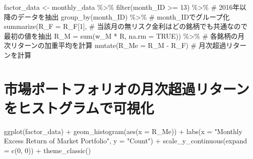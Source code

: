 \documentclass[
  letterpaper,
  DIV=11,
  numbers=noendperiod]{scrreprt}
\newenvironment{Shaded}{\begin{snugshade}}{\end{snugshade}}
\newcommand{\AttributeTok}[1]{\textcolor[rgb]{0.40,0.45,0.13}{#1}}
\newcommand{\CommentTok}[1]{\textcolor[rgb]{0.37,0.37,0.37}{#1}}
\newcommand{\ConstantTok}[1]{\textcolor[rgb]{0.56,0.35,0.01}{#1}}
\newcommand{\DecValTok}[1]{\textcolor[rgb]{0.68,0.00,0.00}{#1}}
\newcommand{\FunctionTok}[1]{\textcolor[rgb]{0.28,0.35,0.67}{#1}}
\newcommand{\NormalTok}[1]{\textcolor[rgb]{0.00,0.23,0.31}{#1}}
\newcommand{\OtherTok}[1]{\textcolor[rgb]{0.00,0.23,0.31}{#1}}
\newcommand{\SpecialCharTok}[1]{\textcolor[rgb]{0.37,0.37,0.37}{#1}}
\newcommand{\StringTok}[1]{\textcolor[rgb]{0.13,0.47,0.30}{#1}}
\begin{document}
\begin{Shaded}
\begin{Highlighting}[]
\NormalTok{factor\_data }\OtherTok{\textless{}{-}}\NormalTok{ monthly\_data }\SpecialCharTok{\%\textgreater{}\%} 
  \FunctionTok{filter}\NormalTok{(month\_ID }\SpecialCharTok{\textgreater{}=} \DecValTok{13}\NormalTok{) }\SpecialCharTok{\%\textgreater{}\%} \CommentTok{\# 2016年以降のデータを抽出}
  \FunctionTok{group\_by}\NormalTok{(month\_ID) }\SpecialCharTok{\%\textgreater{}\%} \CommentTok{\# month\_IDでグループ化}
  \FunctionTok{summarize}\NormalTok{(}\AttributeTok{R\_F =}\NormalTok{ R\_F[}\DecValTok{1}\NormalTok{], }\CommentTok{\# 当該月の無リスク金利はどの銘柄でも共通なので最初の値を抽出}
            \AttributeTok{R\_M =} \FunctionTok{sum}\NormalTok{(w\_M }\SpecialCharTok{*}\NormalTok{ R, }\AttributeTok{na.rm =} \ConstantTok{TRUE}\NormalTok{)) }\SpecialCharTok{\%\textgreater{}\%} \CommentTok{\# 各銘柄の月次リターンの加重平均を計算}
  \FunctionTok{mutate}\NormalTok{(}\AttributeTok{R\_Me =}\NormalTok{ R\_M }\SpecialCharTok{{-}}\NormalTok{ R\_F) }\CommentTok{\# 月次超過リターンを計算}
\end{Highlighting}
\end{Shaded}

\section{市場ポートフォリオの月次超過リターンをヒストグラムで可視化}\label{ux5e02ux5834ux30ddux30fcux30c8ux30d5ux30a9ux30eaux30aaux306eux6708ux6b21ux8d85ux904eux30eaux30bfux30fcux30f3ux3092ux30d2ux30b9ux30c8ux30b0ux30e9ux30e0ux3067ux53efux8996ux5316}

\begin{Shaded}
\begin{Highlighting}[]
\FunctionTok{ggplot}\NormalTok{(factor\_data) }\SpecialCharTok{+} 
  \FunctionTok{geom\_histogram}\NormalTok{(}\FunctionTok{aes}\NormalTok{(}\AttributeTok{x =}\NormalTok{ R\_Me)) }\SpecialCharTok{+} 
  \FunctionTok{labs}\NormalTok{(}\AttributeTok{x =} \StringTok{"Monthly Excess Return of Market Portfolio"}\NormalTok{, }\AttributeTok{y =} \StringTok{"Count"}\NormalTok{) }\SpecialCharTok{+}
  \FunctionTok{scale\_y\_continuous}\NormalTok{(}\AttributeTok{expand =} \FunctionTok{c}\NormalTok{(}\DecValTok{0}\NormalTok{, }\DecValTok{0}\NormalTok{)) }\SpecialCharTok{+} 
  \FunctionTok{theme\_classic}\NormalTok{()}
\end{Highlighting}
\end{Shaded}
\end{document}
